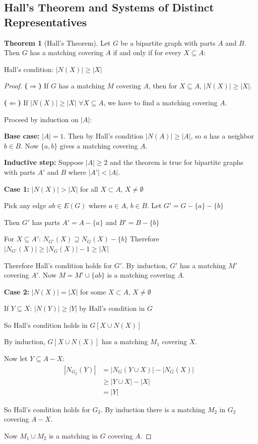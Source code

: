 \documentclass{article}
\theoremstyle{definition}
\newtheorem{theorem}{Theorem}
\begin{document}
\subsection{Hall's Theorem and Systems of Distinct Representatives}
\begin{theorem}[Hall's Theorem]
Let $G$ be a bipartite graph with parts $A$ and $B$. Then $G$ has a matching covering $A$ if and only if for every $X \subseteq A$:

Hall's condition: $|N(X)| \geq |X|$
\end{theorem}


\begin{proof}
\textbf{($\Rightarrow$)} If $G$ has a matching $M$ covering $A$, then for $X \subseteq A$, $|N(X)| \geq |X|$.

\textbf{($\Leftarrow$)} If $|N(X)| \geq |X|$ $\forall X \subseteq A$, we have to find a matching covering $A$.

Proceed by induction on $|A|$:

\textbf{Base case:} $|A| = 1$. Then by Hall's condition $|N(A)| \geq |A|$, so $a$ has a neighbor $b \in B$. Now $\{a,b\}$ gives a matching covering $A$.

\textbf{Inductive step:} Suppose $|A| \geq 2$ and the theorem is true for bipartite graphs with parts $A'$ and $B$ where $|A'| < |A|$.

\textbf{Case 1:} $|N(X)| > |X|$ for all $X \subset A$, $X \neq \emptyset$

Pick any edge $ab \in E(G)$ where $a \in A$, $b \in B$.
Let $G' = G - \{a\} - \{b\}$

Then $G'$ has parts $A' = A - \{a\}$ and $B' = B - \{b\}$

For $X \subseteq A'$: $N_{G'}(X) \supseteq N_G(X) - \{b\}$
Therefore $|N_{G'}(X)| \geq |N_G(X)| - 1 \geq |X|$

Therefore Hall's condition holds for $G'$.
By induction, $G'$ has a matching $M'$ covering $A'$.
Now $M = M' \cup \{ab\}$ is a matching covering $A$.

\textbf{Case 2:} $|N(X)| = |X|$ for some $X \subset A$, $X \neq \emptyset$

If $Y \subseteq X$:
$|N(Y)| \geq |Y|$ by Hall's condition in $G$

So Hall's condition holds in $G[X\cup N(X)]$

By induction, $G[X\cup N(X)]$ has a matching $M_1$ covering $X$.

Now let $Y \subseteq A-X$:
\begin{align*}
|N_{G_2}(Y)| &= |N_G(Y\cup X)| - |N_G(X)| \\
&\geq |Y\cup X| - |X| \\
&= |Y|
\end{align*}

So Hall's condition holds for $G_2$. By induction there is a matching $M_2$ in $G_2$ covering $A-X$.

Now $M_1\cup M_2$ is a matching in $G$ covering $A$.
\end{proof}
\end{document}
